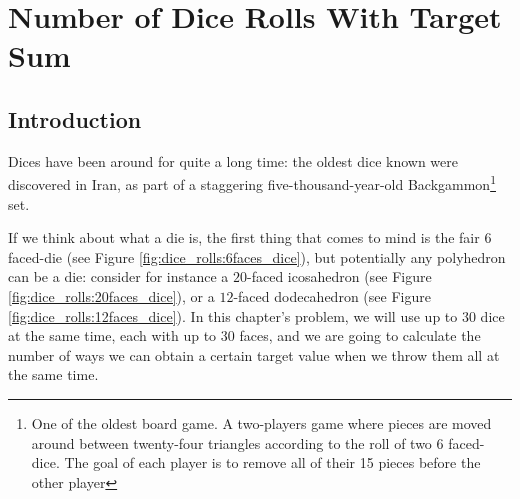 %

\chapter{Number of Dice Rolls With Target Sum}
\label{ch:dice_rolls}
\section*{Introduction}

Dices have been around for quite a long time: the oldest dice known  were discovered in Iran, as part of a staggering five-thousand-year-old
 Backgammon\footnote{One of the oldest board game. A two-players game where pieces are moved around between twenty-four triangles according to the roll of two 6 faced-dice. The goal of each player is to remove all of their 15 pieces before the other player} set.

If we think about what a die is, the first thing that comes to mind is the fair $6$ faced-die (see Figure \ref{fig:dice_rolls:6faces_dice}), but potentially any polyhedron can be a die: consider for instance a  $20$-faced icosahedron (see Figure
\ref{fig:dice_rolls:20faces_dice}), or a $12$-faced dodecahedron (see Figure
\ref{fig:dice_rolls:12faces_dice}).
In this chapter's problem, we will use up to $30$ dice at the same time,
each with up to $30$ faces, and we are going to calculate the number of ways we can obtain a certain
target value when we throw them all at the same time.


